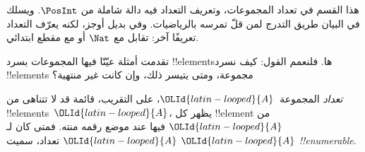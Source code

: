\documentclass[../../../include/open-logic-section]{subfiles}
\begin{document}


\begin{editorial}
هذا القسم في تعداد المجموعات، وتعريف التعداد فيه دالة شاملة من
$\PosInt$. ويسلك في البيان طريق التدرج لمن قلّ تمرسه بالرياضيات.
وفي  بديل أوجز، لكنه يعرّف التعداد تعريفًا
آخر: تقابل مع $\Nat$ أو مع مقطع ابتدائي.
\end{editorial}

\begin{explain}
تقدمت أمثلة عيّنّا فيها المجموعات بسرد !!{element}sها.
فلنعمم القول: كيف نسرد !!{element}s مجموعة، ومتى يتيسر ذلك،
وإن كانت غير منتهية؟
\end{explain}

\begin{defn}
\emph{تعداد} المجموعة~$\OLId{latin-looped}{A}$، على التقريب، قائمة قد لا تتناهى من
!!{element}s~$\OLId{latin-looped}{A}$، يظهر كل !!{element} من $\OLId{latin-looped}{A}$ فيها عند موضع
رقمه منته. فمتى كان لـ$\OLId{latin-looped}{A}$ تعداد، سميت $\OLId{latin-looped}{A}$ \emph{!!{enumerable}}.
\end{defn}
\end{document}
